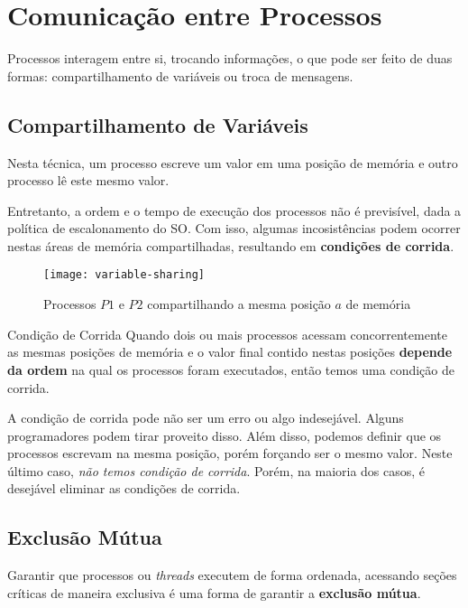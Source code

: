 \section{Comunicação entre Processos}
Processos interagem entre si, trocando informações, o que pode ser feito de duas formas: compartilhamento de variáveis ou troca de mensagens.


\subsection{Compartilhamento de Variáveis}
Nesta técnica, um processo escreve um valor em uma posição de memória e outro processo lê este mesmo valor.

Entretanto, a ordem e o tempo de execução dos processos não é previsível, dada a política de escalonamento do SO. Com isso, algumas incosistências podem ocorrer nestas áreas de memória compartilhadas, resultando em \textbf{condições de corrida}.

\begin{figure}
  \centering
  \texttt{[image: variable-sharing]}
  \caption{Processos $P1$ e $P2$ compartilhando a mesma posição $a$ de memória}
  \label{fig:variable-sharing}
\end{figure}

\begin{definicao}{Condição de Corrida}
  Quando dois ou mais processos acessam concorrentemente as mesmas posições de memória e o valor final contido nestas posições \textbf{depende da ordem} na qual os processos foram executados, então temos uma condição de corrida.
\end{definicao}

A condição de corrida pode não ser um erro ou algo indesejável. Alguns programadores podem tirar proveito disso. Além disso, podemos definir que os processos escrevam na mesma posição, porém forçando ser o mesmo valor. Neste último caso, \textit{não temos condição de corrida}. Porém, na maioria dos casos, é desejável eliminar as condições de corrida.





\subsection{Exclusão Mútua}
Garantir que processos ou \textit{threads} executem de forma ordenada, acessando seções críticas de maneira exclusiva é uma forma de garantir a \textbf{exclusão mútua}.

